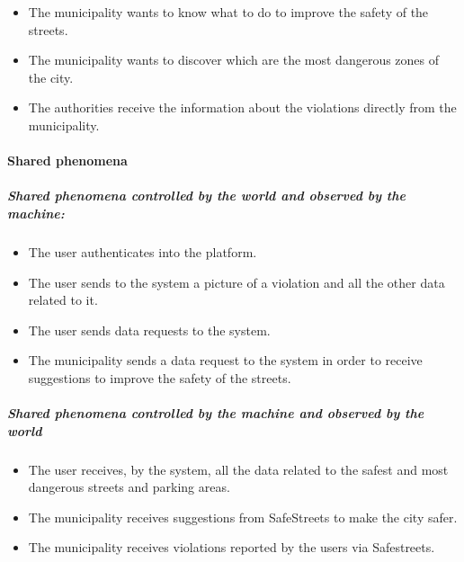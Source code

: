 \documentclass[titlepage]{article}
\begin{document}
\begin{itemize}
	\item The municipality wants to know what to do to 				improve the safety of the streets.
	\item The municipality wants to discover which are the most
	dangerous zones of the city.
	\item The authorities receive the information about the violations directly from the municipality. 
\end{itemize}
 
\paragraph{Shared phenomena }
\subparagraph{Shared phenomena controlled by the world and observed by the machine: }
\begin{itemize}
    \item The user authenticates into the platform.
 	\item The user sends to the system a picture of a            	violation and all the other data related to it.
 	\item The user sends data requests to the system.
	\item The municipality sends a data request to the system 		  in order to receive suggestions to improve the safety of the streets.
\end{itemize}
\subparagraph{Shared phenomena controlled by the machine and  			observed by the world }
\begin{itemize}
	\item The user receives, by the system, all the data 			related to the safest and most dangerous streets and parking areas.
	\item The municipality receives suggestions from SafeStreets to make the city safer.
	\item The municipality receives violations reported by the users via Safestreets.
	
\end{itemize}
\end{document}
